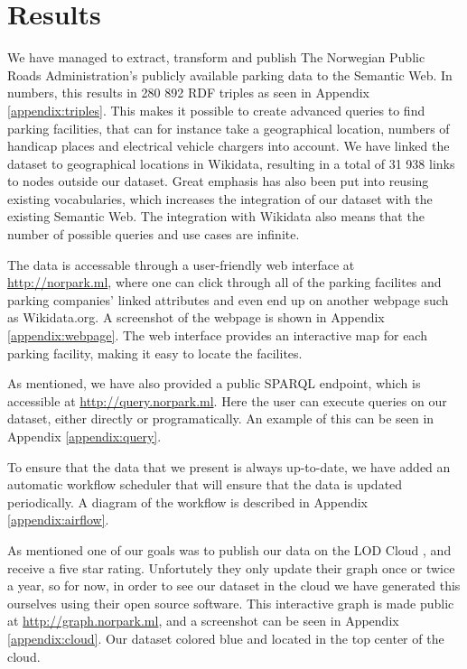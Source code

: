 \chapter{Results}
We have managed to extract, transform and publish The Norwegian Public Roads Administration's publicly available parking data to the Semantic Web. In numbers, this results in 280 892 RDF triples as seen in Appendix \ref{appendix:triples}. This makes it possible to create advanced queries to find parking facilities, that can for instance take a geographical location, numbers of handicap places and electrical vehicle chargers into account. We have linked the dataset to geographical locations in Wikidata, resulting in a total of 31 938 links to nodes outside our dataset. Great emphasis has also been put into reusing existing vocabularies, which increases the integration of our dataset with the existing Semantic Web. The integration with Wikidata also means that the number of possible queries and use cases are infinite.

\vspace{5mm}
The data is accessable through a user-friendly web interface at \url{http://norpark.ml}, where one can click through all of the parking facilites and parking companies' linked attributes and even end up on another webpage such as Wikidata.org. A screenshot of the webpage is shown in Appendix \ref{appendix:webpage}. The web interface provides an interactive map for each parking facility, making it easy to locate the facilites.

\vspace{5mm}

As mentioned, we have also provided a public SPARQL endpoint, which is accessible at \url{http://query.norpark.ml}. Here the user can execute queries on our dataset, either directly or programatically. An example of this can be seen in Appendix \ref{appendix:query}.

\vspace{5mm}

To ensure that the data that we present is always up-to-date, we have added an automatic workflow scheduler that will ensure that the data is updated periodically. A diagram of the workflow is described in Appendix \ref{appendix:airflow}.

\vspace{5mm}

As mentioned one of our goals was to publish our data on the LOD Cloud \cite{lod-cloud}, and receive a five star rating. Unfortutely they only update their graph once or twice a year, so for now, in order to see our dataset in the cloud we have generated this ourselves using their open source software. This interactive graph is made public at \url{http://graph.norpark.ml}, and a screenshot can be seen in Appendix \ref{appendix:cloud}. Our dataset colored blue and located in the top center of the cloud.

